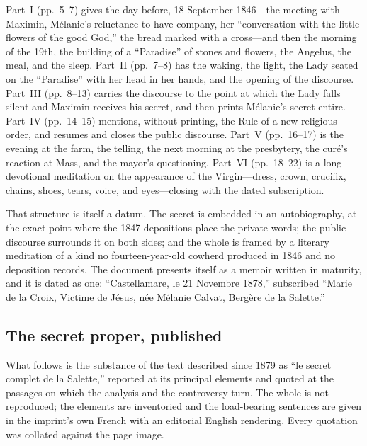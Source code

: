 Part~I (pp.~5--7) gives the day before, 18 September 1846---the
meeting with Maximin, Mélanie's reluctance to have company, her
``conversation with the little flowers of the good God,'' the bread
marked with a cross---and then the morning of the 19th, the building
of a ``Paradise'' of stones and flowers, the Angelus, the meal, and
the sleep. Part~II (pp.~7--8) has the waking, the light, the Lady
seated on the ``Paradise'' with her head in her hands, and the
opening of the discourse. Part~III (pp.~8--13) carries the discourse
to the point at which the Lady falls silent and Maximin receives his
secret, and then prints Mélanie's secret entire. Part~IV
(pp.~14--15) mentions, without printing, the Rule of a new religious
order, and resumes and closes the public discourse. Part~V
(pp.~16--17) is the evening at the farm, the telling, the next
morning at the presbytery, the curé's reaction at Mass, and the
mayor's questioning. Part~VI (pp.~18--22) is a long devotional
meditation on the appearance of the Virgin---dress, crown, crucifix,
chains, shoes, tears, voice, and eyes---closing with the dated
subscription.

That structure is itself a datum. The secret is embedded in an
autobiography, at the exact point where the 1847 depositions place
the private words; the public discourse surrounds it on both sides;
and the whole is framed by a literary meditation of a kind no
fourteen-year-old cowherd produced in 1846 and no deposition
records. The document presents itself as a memoir written in
maturity, and it is dated as one: ``Castellamare, le 21 Novembre
1878,'' subscribed ``Marie de la Croix, Victime de Jésus, née
Mélanie Calvat, Bergère de la Salette.''

\subsection{The secret proper, published}

What follows is the substance of the text described since 1879 as
``le secret complet de la Salette,'' reported at its principal
elements and quoted at the passages on which the analysis and the
controversy turn. The whole is not reproduced; the elements are
inventoried and the load-bearing sentences are given in the imprint's
own French with an editorial English rendering. Every quotation was
collated against the page image.

